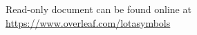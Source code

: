 \documentclass[12pt]{article}
\begin{document}
  

\pagebreak
\small{Read-only document can be found online at \url{https://www.overleaf.com/lotasymbols}} %
 

 
\end{document}
